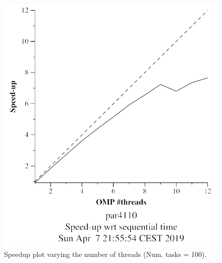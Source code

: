 \documentclass[12pt, a4paper]{article}
\begin{document}
\begin{figure}[H]
\begin{minipage}[b]{0.4\linewidth}
  \includegraphics[scale=0.5]{./mandel-omp-10000-strong-omp-24-100-speedup}
  \caption{Speedup plot varying the number of threads (Num. tasks = 100).}
  \label{fig:mandel-omp-10000-strong-omp-24-100-speedup}
\end{minipage}
\end{figure}
\end{document}
